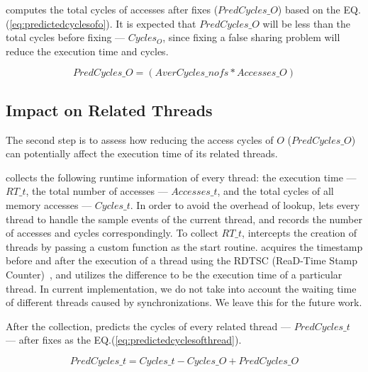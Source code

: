 \cheetah{} computes the total cycles of accesses after fixes ($PredCycles\_{O}$) based on the EQ.(\ref{eq:predictedcyclesofo}).  It is expected that $PredCycles\_{O}$ will be less than the total cycles before fixing --- $Cycles_O$, since fixing a false sharing problem will reduce the execution time and cycles.  

\begin{equation}
\label{eq:predictedcyclesofo}
PredCycles\_{O} = (AverCycles\_{nofs} * Accesses\_O)
\end{equation} 

\subsection{Impact on Related Threads}
\label{sec:impactthread}

The second step is to assess how reducing the access cycles of $O$ ($PredCycles\_{O}$) can potentially affect the execution time of its related threads. 

\Cheetah{} collects the following runtime information of every thread: the execution time --- $RT\_{t}$, the total number of accesses --- $Accesses\_{t}$, and the total cycles of all memory accesses --- $Cycles\_{t}$. In order to avoid the overhead of lookup, \cheetah{} lets every thread to handle the sample events of the current thread, and records the number of accesses and cycles correspondingly. To collect $RT\_{t}$, \cheetah{} intercepts the creation of threads by passing a custom function as the start routine. \cheetah{} acquires the timestamp before and after the execution of a thread using the RDTSC (ReaD-Time Stamp Counter)~\cite{rtdsc}, and utilizes the difference to be the execution time of a particular thread. In current implementation, we do not take into account the waiting time of different threads caused by synchronizations. We leave this for the future work. 

After the collection, \cheetah{} predicts the cycles of every related thread --- $PredCycles\_{t}$ --- after fixes as the EQ.(\ref{eq:predictedcyclesofthread}). 

\begin{equation}
\label{eq:predictedcyclesofthread}
 PredCycles\_{t} = Cycles\_{t} - Cycles\_{O} + PredCycles\_{O} 
\end{equation} 
 
